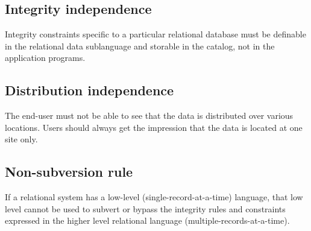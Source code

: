 \documentclass[slides]{pgnotes}
\begin{document}
\subsection{Integrity independence}
  Integrity constraints specific to a particular relational database must be definable in the relational data sublanguage and storable in the catalog, not in the application programs.
  
\subsection{Distribution independence}
  The end-user must not be able to see that the data is distributed over various locations. Users should always get the impression that the data is located at one site only.

\subsection{Non-subversion rule}
  If a relational system has a low-level (single-record-at-a-time) language, that low level cannot be used to subvert or bypass the integrity rules and constraints expressed in the higher level relational language (multiple-records-at-a-time).
\end{document}
